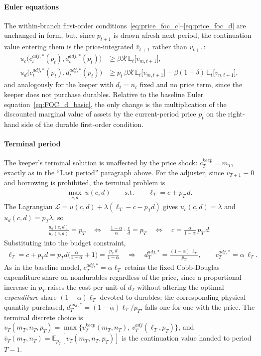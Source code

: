 \paragraph{Euler equations}
The within-branch first-order conditions~\eqref{eq:price_foc_c}--\eqref{eq:price_foc_d} are unchanged in form, but, since $p_{t+1}$ is drawn afresh next period, the continuation value entering them is the price-integrated $\bar v_{t+1}$ rather than $v_{t+1}$:
\begin{align}
	u_c\big(c_t^{adj,\ast}(p_t),d_t^{adj,\ast}(p_t)\big) &\ge \beta \mathcal{R}\, \mathbb{E}_t\big[\bar v_{m,t+1}\big], \\
	u_d\big(c_t^{adj,\ast}(p_t),d_t^{adj,\ast}(p_t)\big) &\ge p_t\,\beta \mathcal{R}\, \mathbb{E}_t\big[\bar v_{m,t+1}\big] - \beta(1-\delta)\,\mathbb{E}_t\big[\bar v_{n,t+1}\big],
\end{align}
and analogously for the keeper with $d_t=n_t$ fixed and no price term, since the keeper does not purchase durables. Relative to the baseline Euler equation~\eqref{eq:FOC_d_basic}, the only change is the multiplication of the discounted marginal value of assets by the current-period price $p_t$ on the right-hand side of the durable first-order condition.

\paragraph{Terminal period}
The keeper's terminal solution is unaffected by the price shock: $c_T^{keep}=m_T$, exactly as in the ``Last period'' paragraph above. For the adjuster, since $v_{T+1}\equiv 0$ and borrowing is prohibited, the terminal problem is
\begin{align}
	\max_{c,d}\ u(c,d) \qquad \text{s.t.}\qquad \ell_T = c + p_T\, d.
\end{align}
The Lagrangian $\mathscr{L}=u(c,d)+\lambda(\ell_T - c - p_T d)$ gives $u_c(c,d)=\lambda$ and $u_d(c,d)=p_T\lambda$, so
\begin{align}
	\frac{u_d(c,d)}{u_c(c,d)} = p_T
	\quad\Longleftrightarrow\quad
	\frac{1-\alpha}{\alpha}\cdot\frac{c}{d} = p_T
	\quad\Longleftrightarrow\quad
	c = \frac{\alpha}{1-\alpha}\, p_T\, d.
\end{align}
Substituting into the budget constraint,
\begin{align}
	\ell_T = c + p_T d = p_T d\Big(\frac{\alpha}{1-\alpha}+1\Big) = \frac{p_T\, d}{1-\alpha}
	\quad\Longrightarrow\quad
	d_T^{adj,\ast} = \frac{(1-\alpha)\,\ell_T}{p_T}, \qquad c_T^{adj,\ast} = \alpha\,\ell_T. \label{eq:price_terminal}
\end{align}
As in the baseline model, $c_T^{adj,\ast}=\alpha\ell_T$ retains the fixed Cobb-Douglas expenditure share on nondurables regardless of the price, since a proportional increase in $p_T$ raises the cost per unit of $d_T$ without altering the optimal \emph{expenditure} share $(1-\alpha)\ell_T$ devoted to durables; the corresponding physical quantity purchased, $d_T^{adj,\ast}=(1-\alpha)\ell_T/p_T$, falls one-for-one with the price. The terminal discrete choice is $v_T(m_T,n_T,p_T)=\max\{v_T^{keep}(m_T,n_T),\,v_T^{adj}(\ell_T,p_T)\}$, and $\bar v_T(m_T,n_T)=\mathbb{E}_{p_T}[v_T(m_T,n_T,p_T)]$ is the continuation value handed to period $T-1$.

